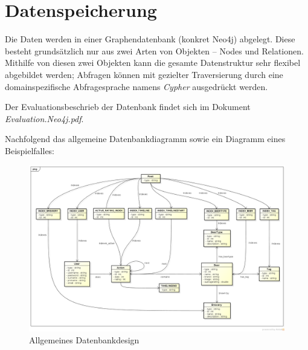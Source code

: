 \documentclass[10pt,a4paper]{scrartcl}
\begin{document}
\section{Datenspeicherung}

Die Daten werden in einer Graphendatenbank (konkret Neo4j) abgelegt. Diese besteht grundsätzlich nur
aus zwei Arten von Objekten -- Nodes und Relationen. Mithilfe von diesen zwei Objekten kann die
gesamte Datenstruktur sehr flexibel abgebildet werden; Abfragen können mit gezielter Traversierung
durch eine domainspezifische Abfragesprache namens \textit{Cypher} ausgedrückt werden.

Der Evaluationsbeschrieb der Datenbank findet sich im Dokument \textit{Evaluation.Neo4j.pdf}.

Nachfolgend das allgemeine Datenbankdiagramm sowie ein Diagramm eines Beispielfalles:

\begin{figure}[H]
	\includegraphics[height=0.9\textwidth,angle=90]{Database_Design_Graph.png}
	\caption{Allgemeines Datenbankdesign}
	\label{fig:database_design}
\end{figure}
\end{document}
